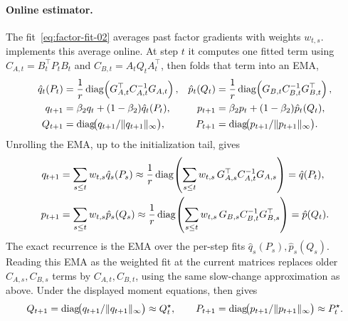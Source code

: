 \paragraph{Online estimator.} The fit~\eqref{eq:factor-fit-02} averages past
factor gradients with weights $w_{t,s}$. \methodname{} implements this
average online. At step $t$ it computes one fitted term using
$C_{A,t}=B_t^\top P_tB_t$ and $C_{B,t}=A_tQ_tA_t^\top$, then folds that term
into an EMA,
\begin{equation}\label{eq:ours-klcoupling-02}
\begin{aligned}
  \hat{q}_t(P_t) &= \frac1r\operatorname{diag}\!\left(G_{A,t}^\top C_{A,t}^{-1}G_{A,t}\right),
  &
  \hat{p}_t(Q_t) &= \frac1r\operatorname{diag}\!\left(G_{B,t} C_{B,t}^{-1}G_{B,t}^\top\right),
  \\
  q_{t+1} &= \beta_2q_t+(1-\beta_2)\hat{q}_t(P_t),
  &
  p_{t+1} &= \beta_2p_t+(1-\beta_2)\hat{p}_t(Q_t),
  \\
  Q_{t+1} &= \operatorname{diag}\!\bigl(q_{t+1}/\| q_{t+1}\|_\infty\bigr),
  &
  P_{t+1} &= \operatorname{diag}\!\bigl(p_{t+1}/\| p_{t+1}\|_\infty\bigr).
\end{aligned}
\end{equation}
Unrolling the EMA, up to the initialization tail, gives
\[
\begin{aligned}
  q_{t+1}
  &=
  \sum_{s\le t}w_{t,s}\hat q_s(P_s)
  \approx
  \frac1r\operatorname{diag}\!\left(
    \sum_{s\le t}w_{t,s}\,G_{A,s}^\top C_{A,t}^{-1}G_{A,s}
  \right)
  =
  \hat q(P_t),\\
  p_{t+1}
  &=
  \sum_{s\le t}w_{t,s}\hat p_s(Q_s)
  \approx
  \frac1r\operatorname{diag}\!\left(
    \sum_{s\le t}w_{t,s}\,G_{B,s}C_{B,t}^{-1}G_{B,s}^\top
  \right)
  =
  \hat p(Q_t).
\end{aligned}
\]
The exact recurrence is the EMA over the per-step fits
$\hat q_s(P_s),\hat p_s(Q_s)$. Reading this EMA as the weighted fit at the
current matrices replaces older $C_{A,s},C_{B,s}$ terms by
$C_{A,t},C_{B,t}$, using the same slow-change approximation as above. Under
the displayed moment equations,  then gives
\[
  Q_{t+1}
  =
  \operatorname{diag}\!\bigl(q_{t+1}/\| q_{t+1}\|_\infty\bigr)
  \approx Q^\star_t,
  \qquad
  P_{t+1}
  =
  \operatorname{diag}\!\bigl(p_{t+1}/\| p_{t+1}\|_\infty\bigr)
  \approx P^\star_t .
\]

